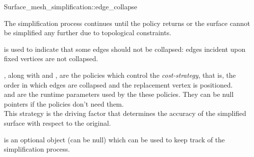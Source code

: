 \begin{ccRefFunction}{Surface_mesh_simplification::edge_collapse}

The simplification process continues until the  policy returns 
or the surface cannot be simplified any further due to topological constraints.

 is used to indicate that some edges should not be
collapsed: edges incident upon fixed vertices are not collapsed.

, along with  and ,
are the policies which control the {\em cost-strategy}, that is, 
the order in which edges are collapsed and the replacement vertex is positioned.\\
 and  are the runtime 
parameters used by the these policies. They can be null pointers
if the policies don't need them.\\
This strategy is the driving factor that determines the accuracy of the
simplified surface with respect to the original.

 is an optional object (can be null) which can be used
to keep track of the simplification process.

\end{ccRefFunction}



